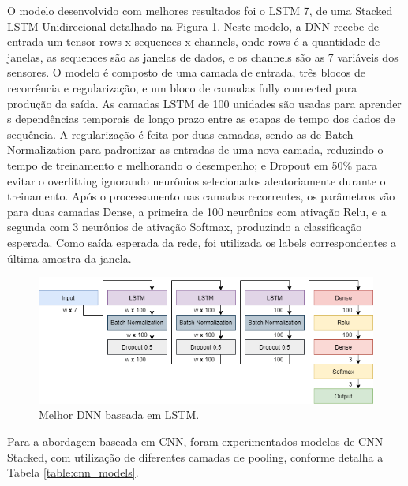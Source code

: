 O modelo desenvolvido com melhores resultados foi o LSTM 7, de uma Stacked LSTM Unidirecional detalhado na Figura \ref{fig:lstm_dnn}. Neste modelo, a DNN recebe de entrada um tensor rows x sequences x channels, onde rows é a quantidade de janelas, as sequences são as janelas de dados, e os channels são as 7 variáveis dos sensores. O modelo é composto de uma camada de entrada, três blocos de recorrência e regularização, e um bloco de camadas fully connected para produção da saída. As camadas LSTM de 100 unidades são usadas para aprender s dependências temporais de longo prazo entre as etapas de tempo dos dados de sequência. A regularização é feita por duas camadas, sendo as de Batch Normalization para padronizar as entradas de uma nova camada, reduzindo o tempo de treinamento \cite{Zebin2018} e melhorando o desempenho; e Dropout em 50\% para evitar o overfitting ignorando neurônios selecionados aleatoriamente durante o treinamento. Após o processamento nas camadas recorrentes, os parâmetros vão para duas camadas Dense, a primeira de 100 neurônios com ativação Relu, e a segunda com 3 neurônios de ativação Softmax, produzindo a classificação esperada. Como saída esperada da rede, foi utilizada os labels correspondentes a última amostra da janela.

\begin{figure}[h!]
  \centering
  \includegraphics[width=1\textwidth]{figuras/lstm_dnn.png}
  \caption{Melhor DNN baseada em LSTM.}
  \label{fig:lstm_dnn}
\end{figure}

Para a abordagem baseada em CNN, foram experimentados modelos de CNN Stacked, com utilização de diferentes camadas de pooling, conforme detalha a Tabela \ref{table:cnn_models}.

